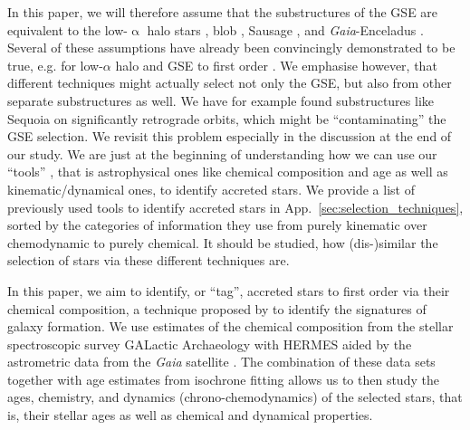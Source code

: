\documentclass[fleqn,usenatbib]{mnras}
\newcommand{\Gaia}{\textit{Gaia}\xspace} %
\begin{document}
In this paper, we will therefore assume that the substructures of the GSE are equivalent to the low-$\upalpha$ halo stars \citep{Nissen2010, Hayes2018}, blob \citep{Koppelman2018, Das2020}, Sausage \citep{Belokurov2018}, and \Gaia-Enceladus \citep{Helmi2018}. Several of these assumptions have already been convincingly demonstrated to be true, e.g. for low-$\alpha$ halo and GSE to first order \citep{Haywood2018, Mackereth2019}. We emphasise however, that different techniques might actually select not only the GSE, but also from other separate substructures as well. We have for example found substructures like Sequoia \citep{Barba2019, Myeong2019} on significantly retrograde orbits, which might be ``contaminating'' the GSE selection. We revisit this problem especially in the discussion at the end of our study. 
We are just at the beginning of understanding how we can use our ``tools'' \citep{Helmi2020}, that is astrophysical ones like chemical composition and age as well as kinematic/dynamical ones, to identify accreted stars. We provide a list of previously used tools to identify accreted stars in App.~\ref{sec:selection_techniques}, sorted by the categories of information they use from purely kinematic over chemodynamic to purely chemical. It should be studied, how (dis-)similar the selection of stars via these different techniques are.

In this paper, we aim to identify, or ``tag'', accreted stars to first order via their chemical composition, a technique proposed by \citet{FreemanBlandHawthorn2002} to identify the signatures of galaxy formation. We use estimates of the chemical composition from the stellar spectroscopic survey GALactic Archaeology with HERMES \citep[GALAH, ][]{DeSilva2015, Buder2021} aided by the astrometric data from the \Gaia satellite \citep{Brown2021}. The combination of these data sets together with age estimates from isochrone fitting allows us to then study the ages, chemistry, and dynamics (chrono-chemodynamics) of the selected stars, that is, their stellar ages as well as chemical and dynamical properties.
\end{document}
